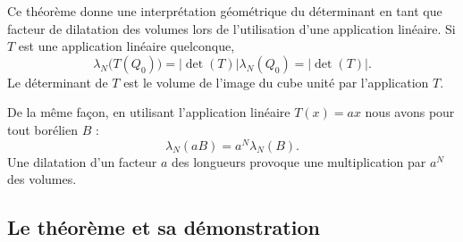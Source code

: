 Ce théorème donne une interprétation géométrique du déterminant en tant que facteur de dilatation des volumes lors de l'utilisation d'une application linéaire. Si \( T\) est une application linéaire quelconque,
\begin{equation}
    \lambda_N\big( T(Q_0) \big)=| \det(T) |\lambda_N(Q_0)=| \det(T) |.
\end{equation}
Le déterminant de \( T\) est le volume de l'image du cube unité par l'application \( T\).

De la même façon, en utilisant l'application linéaire \( T(x)=ax\) nous avons pour tout borélien \( B\) :
\begin{equation}
    \lambda_N(aB)=a^N\lambda_N(B).
\end{equation}
Une dilatation d'un facteur \( a\) des longueurs provoque une multiplication par \( a^N\) des volumes.

\subsection{Le théorème et sa démonstration}


